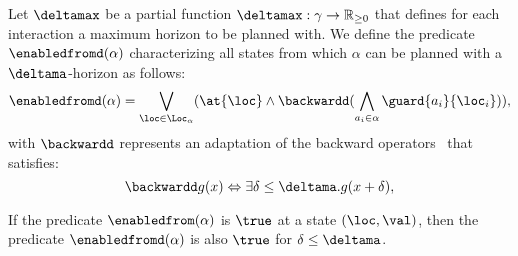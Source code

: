 Let $\deltamax$ be a partial function $\deltamax: \gamma \to \mathbb{R}_{\ge 0}$ that defines for each
interaction a maximum horizon to be planned with. We define the predicate $\enabledfromd(\alpha)$ characterizing all states from which 
$\alpha$ can be planned with a $\deltama$-horizon as follows:  
\begin{displaymath}
    \enabledfromd(\alpha)=\bigvee_{\loc\in\Loc_{\alpha}} (\at{\loc}\wedge\backwardd(\bigwedge_{a_i\in\alpha}
    \guard{a_i}{\loc_i})), 
\end{displaymath}
  with $\backwardd$ represents an adaptation of the backward operators~\cite{tripakis98:thesis} that satisfies:
\begin{displaymath}
\backwardd g(x)\Leftrightarrow \exists\delta\le\deltama . g (x + \delta),
\end{displaymath}
\begin{property}\label{pt:delta}
  If the predicate $\enabledfrom(\alpha)$ is $\true$ at a state $(\loc,\val)$, then the 
  predicate $\enabledfromd(\alpha)$ is also $\true$ for $\delta\le\deltama$.
\end{property}

